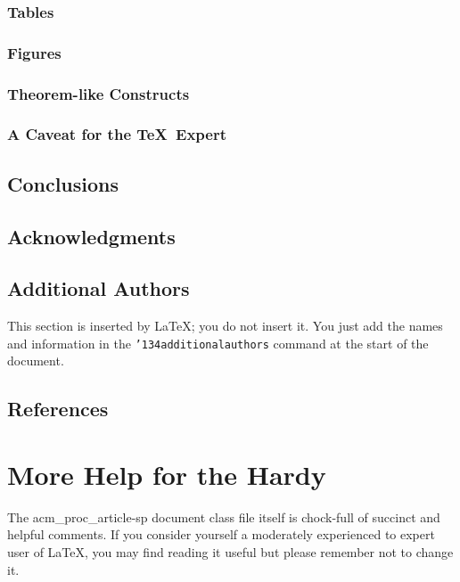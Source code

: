 \documentclass{acm_proc_article-sp}
\begin{document}
\subsubsection{Tables}
\subsubsection{Figures}
\subsubsection{Theorem-like Constructs}
\subsubsection*{A Caveat for the \TeX\ Expert}
\subsection{Conclusions}
\subsection{Acknowledgments}
\subsection{Additional Authors}
This section is inserted by \LaTeX; you do not insert it.
You just add the names and information in the
\texttt{{\char'134}additionalauthors} command at the start
of the document.
\subsection{References}
\section{More Help for the Hardy}
The acm\_proc\_article-sp document class file itself is chock-full of succinct
and helpful comments.  If you consider yourself a moderately
experienced to expert user of \LaTeX, you may find reading
it useful but please remember not to change it.
\balancecolumns
\end{document}
